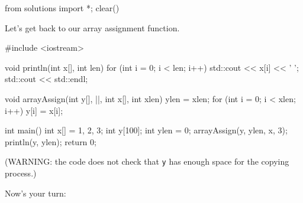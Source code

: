\begin{python0}
from solutions import *; clear()
\end{python0}

Let's get back to our array assignment function.

\begin{consolethree}[escapeinside=||]
#include <iostream>

void println(int x[], int len)
{
    for (int i = 0; i < len; i++)
    {
        std::cout << x[i] << ' ';
    }
    std::cout << std::endl;
}

void arrayAssign(int y[], ||,
                 int x[], int xlen)
{
    ylen = xlen;
    for (int i = 0; i < xlen; i++)
    {
        y[i] = x[i];
    }
}

int main()
{
    int x[] = {1, 2, 3};
    int y[100];
    int ylen = 0;
    arrayAssign(y, ylen, x, 3);
    println(y, ylen);
    return 0;
}
\end{consolethree}

(WARNING: the code does not check that \texttt{y} has enough space for the copying process.)

Now's your turn:






